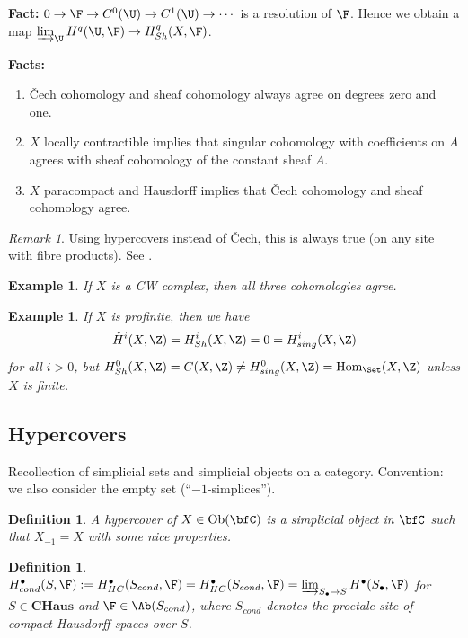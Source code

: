 \documentclass[A4paper, british]{amsart}
\theoremstyle{darkgreentheorem}
\theoremstyle{darkbluedefinition}
\newtheorem{defn}[thm]{Definition}
\theoremstyle{darkredexample}
\newtheorem{exa}[thm]{Example}
\theoremstyle{remark}
\newtheorem{rem}[thm]{Remark}
\DeclareMathOperator{\Hom}{Hom}
\DeclareMathOperator{\Ob}{Ob}
\newcommand{\CHaus}{\mathbf{CHaus}}
\newcommand{\1}{\mathbbm{1}}
\newcommand{\grd}{^{\bullet}}
\begin{document}
\textbf{Fact:} $0\to \F\to C^{0}(\U) \to C^{1}(\U)\to \cdots $ is a resolution of $\F$.
Hence  we obtain a map $\varinjlim_{\U}H^{q}(\U,\F)\to H^{q}_{Sh}(X,\F)$.

\textbf{Facts:}
\begin{enumerate}[label=\arabic*)]
    \item \v{C}ech cohomology and sheaf cohomology always agree on degrees zero and one.
    \item $X$ locally contractible implies that singular cohomology with coefficients on $A$ agrees with sheaf cohomology of the constant sheaf $A$.
    \item $X$ paracompact and Hausdorff implies that \v{C}ech cohomology and sheaf cohomology agree.
\end{enumerate}

\begin{rem}
    Using hypercovers instead of \v{C}ech, this is always true (on any site with fibre products).
    See \cite[\href{https://stacks.math.columbia.edu/tag/01H0}{Tag 01H0}]{sta19}.
\end{rem}

\begin{exa}
    If $X$ is a CW complex, then all three cohomologies agree.
\end{exa}

\begin{exa}
    If $X$ is profinite, then we have
    \[ \check{H}^{i}(X,\Z)=H^{i}_{Sh}(X,\Z)=0=H^{i}_{sing}(X,\Z) \]
    for all $i>0$, but $H^{0}_{Sh}(X,\Z)=C(X,\Z)\neq H^{0}_{sing}(X,\Z)=\Hom_{\Set}(X,\Z)$ unless $X$ is finite.
\end{exa}

\subsection{Hypercovers}

Recollection of simplicial sets and simplicial objects on a category.
Convention: we also consider the empty set (``$-1$-simplices'').

\begin{defn}
    A \textit{hypercover} of $X\in \Ob(\bfC)$ is a simplicial object in $\bfC$ such that $X_{-1}=X$ with some nice properties.
\end{defn}

\begin{defn}
    $H_{cond}\grd(S,\F):=H\grd_{HC}(S_{cond},\F)=H\grd_{HC}(S_{cond},\F)=\varinjlim_{S_{\bullet}\to S}H\grd(S_{\bullet},\F)$ for $S\in \CHaus$ and $\F\in \Ab(S_{cond})$, where $S_{cond}$ denotes the proetale site of compact Hausdorff spaces over $S$.
\end{defn}
\end{document}
